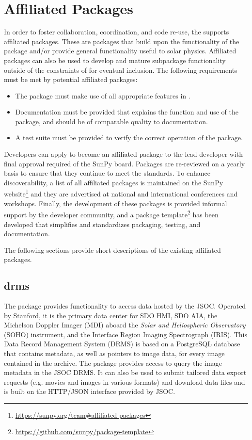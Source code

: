 \section{Affiliated Packages}
\label{sec:affil_package}

In order to foster collaboration, coordination, and code re-use, the \sunpyproj supports affiliated packages.
These are \python packages that build upon the functionality of the \sunpypkg package and/or provide general functionality useful to solar physics.
Affiliated packages can also be used to develop and mature subpackage functionality outside of the constraints of \sunpypkg for eventual inclusion.
The following requirements must be met by potential affiliated packages:
\begin{itemize}
    \item The package must make use of all appropriate features in \sunpypkg.
    \item Documentation must be provided that explains the function and use of the package, and should be of comparable quality to \sunpypkg documentation.
    \item A test suite must be provided to verify the correct operation of the package.
\end{itemize}
Developers can apply to become an affiliated package to the lead developer with final approval required of the SunPy board.
Packages are re-reviewed on a yearly basis to ensure that they continue to meet the standards.
To enhance discoverability, a list of all affiliated packages is maintained on the SunPy website\footnote{\url{https://sunpy.org/team\#affiliated-packages}} and they are advertised at national and international conferences and workshops.
Finally, the development of these packages is provided informal support by the developer community, and
a package template\footnote{\url{https://github.com/sunpy/package-template}} has been developed that simplifies and standardizes packaging, testing, and documentation.

The following sections provide short descriptions of the existing affiliated packages.

\subsection{drms}
\label{sec:drms}

The  package provides functionality to access data hosted by the JSOC.
Operated by Stanford, it is the primary data center for SDO HMI, SDO AIA, the Michelson Doppler Imager (MDI) aboard the \textit{Solar and Heliospheric Observatory} (SOHO) instrument, and the Interface Region Imaging Spectrograph (IRIS).
This Data Record Management System (DRMS) is based on a PostgreSQL database that contains metadata, as well as pointers to image data, for every image contained in the archive.
The  package provides access to query the image metadata in the JSOC DRMS. It can also be used to submit tailored data export requests (e.g. movies and images in various formats) and download data files and is built on the HTTP/JSON interface provided by JSOC.

